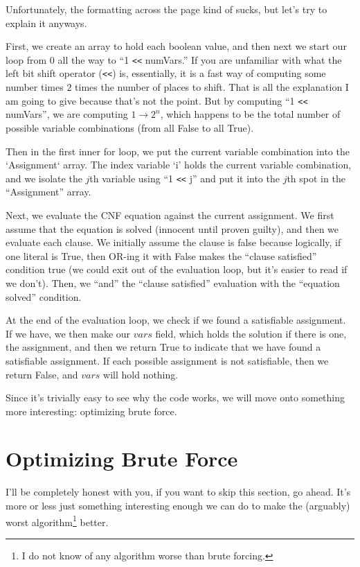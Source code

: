 \documentclass[oneside]{book}
\begin{document}
Unfortunately, the formatting across the page kind of sucks, but let's try to
explain it anyways.

First, we create an array to hold each boolean value, and then next we start
our loop from $0$ all the way to ``1 \verb|<<| numVars.'' If you are unfamiliar with
what the left bit shift operator (\verb|<<|) is, essentially, it is a fast way of
computing some number times $2$ times the number of places to shift. That is
all the explanation I am going to give because that's not the point. But by
computing ``1 \verb|<<| numVars'', we are computing $1 \rightarrow 2^n$, which
happens to be the total number of possible variable combinations (from all
False to all True).

Then in the first inner for loop, we put the current variable combination into
the `Assignment` array. The index variable `i' holds the current variable
combination, and we isolate the $j$th variable using ``1 \verb|<<| j'' and put it into
the $j$th spot in the ``Assignment'' array.

Next, we evaluate the CNF equation against the current assignment. We first
assume that the equation is solved (innocent until proven guilty), and then we
evaluate each clause. We initially assume the clause is false because logically,
if one literal is True, then OR-ing it with False makes the ``clause satisfied''
condition true (we could exit out of the evaluation loop, but it's easier to read
if we don't). Then, we ``and'' the ``clause satisfied'' evaluation with the
``equation solved'' condition.

At the end of the evaluation loop, we check if we found a satisfiable
assignment. If we have, we then make our $vars$ field, which holds the solution
if there is one, the assignment, and then we return True to indicate that we
have found a satisfiable assignment. If each possible assignment is not
satisfiable, then we return False, and $vars$ will hold nothing.

Since it's trivially easy to see why the code works, we will move onto something
more interesting: optimizing brute force.

\section{Optimizing Brute Force}

I'll be completely honest with you, if you want to skip this section, go ahead.
It's more or less just something interesting enough we can do to make the
(arguably) worst algorithm\footnote{I do not know of any algorithm worse than
brute forcing.} better.
\end{document}
